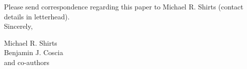 \documentclass[fontsize=11pt]{article}
\begin{document}
	
	\noindent Please send correspondence regarding this paper to Michael R. Shirts (contact
	details in letterhead).\\	
	
	\noindent Sincerely,
	
	\noindent Michael R. Shirts \\
    \noindent Benjamin J. Coscia \\
    and co-authors
	
\end{document}
